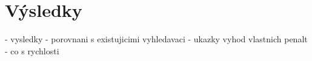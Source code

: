 \section{Výsledky}
- vysledky
  - porovnani s existujicimi vyhledavaci
  - ukazky vyhod vlastnich penalt
  - co s rychlosti
